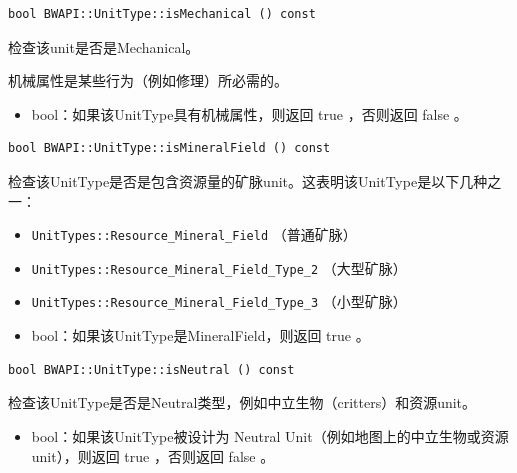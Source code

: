 \begin{tcolorbox}[colback=white, colframe=black!60!white, title=isMechanical(), arc=0mm]
    \begin{verbatim}
bool BWAPI::UnitType::isMechanical () const
    \end{verbatim}
    检查该unit是否是Mechanical。\par 机械属性是某些行为（例如修理）所必需的。
\begin{return}
\begin{itemize}
    \item bool：如果该UnitType具有机械属性，则返回   true  ，否则返回   false  。
\end{itemize}
\end{return}
\end{tcolorbox}


\begin{tcolorbox}[colback=white, colframe=black!60!white, title=isMineralField(), arc=0mm]
    \begin{verbatim}
bool BWAPI::UnitType::isMineralField () const
    \end{verbatim}
    检查该UnitType是否是包含资源量的矿脉unit。这表明该UnitType是以下几种之一：
    \begin{itemize}
        \item \verb|UnitTypes::Resource_Mineral_Field|  （普通矿脉）
        \item \verb|UnitTypes::Resource_Mineral_Field_Type_2|  （大型矿脉）
        \item \verb|UnitTypes::Resource_Mineral_Field_Type_3|  （小型矿脉）
    \end{itemize}
\begin{return}
\begin{itemize}
    \item bool：如果该UnitType是MineralField，则返回   true  。
\end{itemize}
\end{return}
\end{tcolorbox}


\begin{tcolorbox}[colback=white, colframe=black!60!white, title=isNeutral(), arc=0mm]
    \begin{verbatim}
bool BWAPI::UnitType::isNeutral () const
    \end{verbatim}
    检查该UnitType是否是Neutral类型，例如中立生物（critters）和资源unit。
\begin{return}
\begin{itemize}
    \item bool：如果该UnitType被设计为 Neutral Unit（例如地图上的中立生物或资源unit），则返回   true  ，否则返回   false  。
\end{itemize}
\end{return}
\end{tcolorbox}


